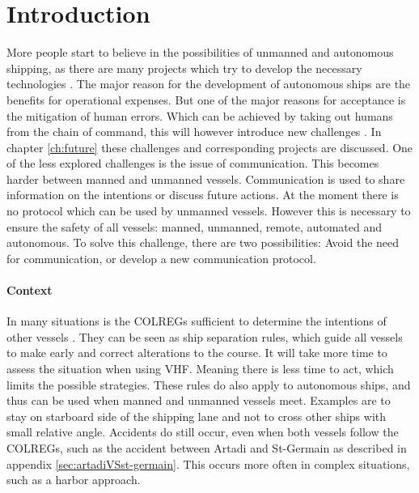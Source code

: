 \chapter*{Introduction}
\label{sec:introduction}

More people start to believe in the possibilities of unmanned and autonomous shipping, as there are many projects which try to develop the necessary technologies \cite{SMASH2017} \cite{Eriksen2017} \cite{MUNIN2016} \cite{Sames2017} \cite{RollsRoyce2015} \cite{Waterborne2016}. The major reason for the development of autonomous ships are the benefits for operational expenses. But one of the major reasons for acceptance is the mitigation of human errors. Which can be achieved by taking out humans from the chain of command, this will however introduce new challenges \cite{Saarni2018}. In chapter \ref{ch:future} these challenges and corresponding projects are discussed. One of the less explored challenges is the issue of communication. This becomes harder between manned and unmanned vessels. Communication is used to share information on the intentions or discuss future actions. At the moment there is no protocol which can be used by unmanned vessels. However this is necessary to ensure the safety of all vessels: manned, unmanned, remote, automated and autonomous. To solve this challenge, there are two possibilities: Avoid the need for communication, or develop a new communication protocol.

\subsubsection*{Context}
In many situations is the \acf{COLREGs} sufficient to determine the intentions of other vessels \cite{IMO1972}. They can be seen as ship separation rules, which guide all vessels to make early and correct alterations to the course. It will take more time to assess the situation when using \ac{VHF}. Meaning there is less time to act, which limits the possible strategies. These rules do also apply to autonomous ships, and thus can be used when manned and unmanned vessels meet.
Examples are to stay on starboard side of the shipping lane and not to cross other ships with small relative angle. Accidents do still occur, even when both vessels follow the \ac{COLREGs}, such as the accident between Artadi and St-Germain as described in appendix \ref{sec:artadiVSst-germain}. This occurs more often in complex situations, such as a harbor approach.

